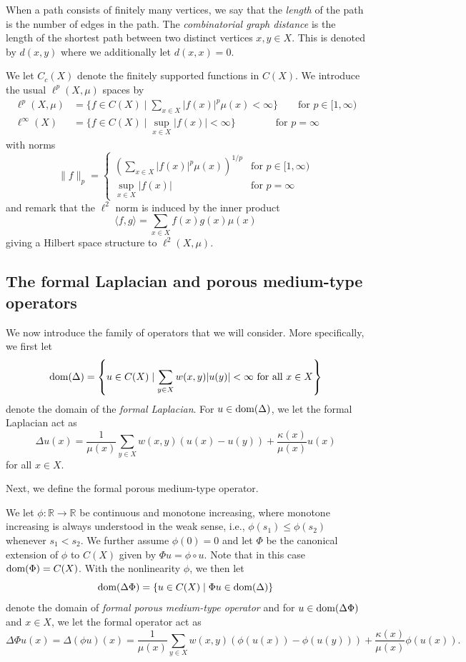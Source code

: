 \documentclass[letterpaper]{article}
\theoremstyle{definition}
\theoremstyle{named}
\numberwithin{equation}{section}
\newcommand{\R}{\mathbb{R}}
\newcommand{\dom}{\textnormal{dom}} %
\newcommand{\ellp}{\ell^p(X,\mu)}
\begin{document}
When a path consists of finitely many vertices, we say that the \emph{length}
of the path is the number of edges in the path.
The \emph{combinatorial graph distance} is the length of the
shortest path between two distinct vertices $x, y \in X$. This is denoted by $d(x,y)$
where we additionally let $d(x,x)=0$.


We let $C_c(X)$ denote the finitely
supported functions in $C(X)$. We introduce the usual $\ellp$ spaces by
\begin{align*}
\ell^p(X,\mu)&= \{ f \in C(X) \mid \sum_{x \in X} |f(x)|^p \mu(x)< \infty \} \qquad	\mbox{for } p \in [1,\infty)\\
\ell^\infty(X) &= \{ f\in C(X) \mid \sup_{x \in X}
|f(x)| < \infty\} \qquad \qquad \mbox{for } p=\infty
\end{align*}
	with  norms
$$
\|f\|_p= \begin{cases}
	\left(\sum_{x\in X} |f(x)|^p\mu(x)\right)^{{1}/{p}} & \mbox{for } p \in [1,\infty)\\
	\sup_{x\in X}|f(x)| & \mbox{for } p =\infty
\end{cases}
$$	
and remark that the $\ell^2$ norm is induced by the inner product
$$
\langle f, g \rangle = \sum_{x\in X} f(x)g(x)\mu(x)
$$
giving a Hilbert space structure to $\ell^2(X,\mu)$. 




\subsection{The formal Laplacian and porous medium-type operators}\label{SSect: The formal Laplacian}
We now introduce the family of operators that we will consider. More specifically,
we first let 
$$\dom(\Delta) = \left\{ u\in C(X) \mid \sum_{y \in X} w(x,y)|u(y)| < \infty
\textup{ for all } x\in X \right\} $$
denote the domain of the \emph{formal Laplacian}.
For $u \in \dom(\Delta)$, we let the formal Laplacian act as
$$\Delta u(x) = \frac{1}{\mu(x)} \sum_{y \in X} w(x,y) (u(x)-u(y)) +
\frac{\kappa(x)}{\mu(x)} u(x)$$
for all $x \in X$.


Next, we define the formal porous medium-type operator. 

We let $\phi \colon \R \to \R$ be continuous and monotone increasing, where
monotone increasing is always understood in the weak sense, i.e.,
$\phi(s_{1}) \leq \phi(s_{2})$ whenever $s_{1} < s_{2}$. We further assume
$\phi(0) = 0$ and let $\Phi$ be the canonical extension of $\phi$
to $C(X)$ given by $\Phi u = \phi \circ u$.
Note that in this case $\dom(\Phi) = C(X)$.
 With the nonlinearity $\phi$, we then let
$$\dom(\Delta \Phi) = \{ u \in C(X) \mid \Phi u \in \dom(\Delta) \}$$
denote the domain of \emph{formal porous medium-type operator} and for $u \in \dom(\Delta \Phi)$
and $x \in X$, we let the formal operator act as
$$\Delta \Phi u(x) = \Delta (\phi u)(x)= \frac{1}{\mu(x)}\sum_{y \in X}w(x,y)(\phi(u(x))-\phi(u(y))) + \frac{\kappa(x)}{\mu(x)}\phi(u(x)).$$
\end{document}
